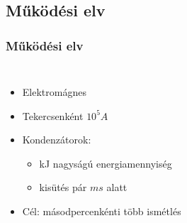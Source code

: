 \documentclass{beamer}
\begin{document}
\subsection{Működési elv}
\begin{frame}
    \frametitle{Működési elv}
    \begin{columns}
        \begin{itemize}
            \footnotesize
            \item Elektromágnes
            \item Tekercsenként $10^5A$
            \item Kondenzátorok: 
            \begin{itemize}
                \item kJ nagyságú energiamennyiség
                \item kisütés pár $ms$ alatt
            \end{itemize}
            \item Cél: másodpercenkénti több ismétlés
        \end{itemize}
    \end{columns}
\end{frame}
\end{document}
